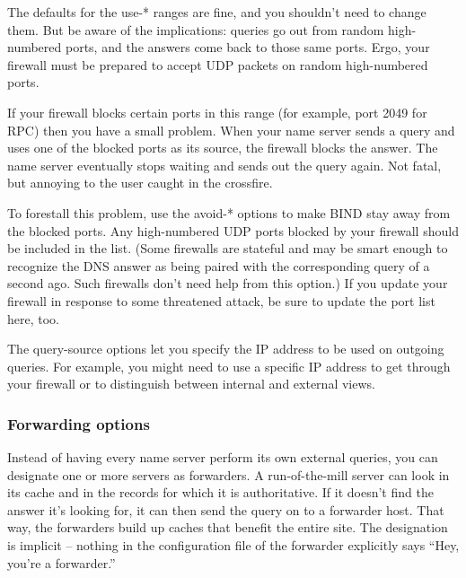 The defaults for the {use-*} ranges are fine, and you shouldn't need to
change them. But be aware of the implications: queries go out from
random high-numbered ports, and the answers come back to those same
ports. Ergo, your firewall must be prepared to accept UDP packets on
random high-numbered ports.

If your firewall blocks certain ports in this range (for example, port
2049 for RPC) then you have a small problem. When your name server sends
a query and uses one of the blocked ports as its source, the firewall
blocks the answer. The name server eventually stops waiting and sends
out the query again. Not fatal, but annoying to the user caught in the
crossfire.

To forestall this problem, use the {avoid-*} options to make BIND stay
away from the blocked ports. Any high-numbered UDP ports blocked by your
firewall should be included in the list. (Some firewalls are stateful
and may be smart enough to recognize the DNS answer as being paired with
the corresponding query of a second ago. Such firewalls don't need help
from this option.) If you update your firewall in response to some
threatened attack, be sure to update the port list here, too.

The {query-source} options let you specify the IP address to be used on
outgoing queries. For example, you might need to use a specific IP
address to get through your firewall or to distinguish between internal
and external views.

\subsubsection[Forwarding options]{\texorpdfstring{Forwarding
options\protect\hypertarget{part0024_split_037.htmlux5cux23_idIndexMarker2145}{}{}\protect\hypertarget{part0024_split_037.htmlux5cux23_idTextAnchor900}{}{}\protect\hypertarget{part0024_split_037.htmlux5cux23_idIndexMarker2146}{}{}}{Forwarding options}}


Instead of having every name server perform its own external queries,
you can designate one or more servers as forwarders. A run-of-the-mill
server can look in its cache and in the records for which it is
authoritative. If it doesn't find the answer it's looking for, it can
then send the query on to a forwarder host. That way, the forwarders
build up caches that benefit the entire site. The designation is
implicit -- nothing in the configuration file of the forwarder explicitly
says ``Hey, you're a forwarder.''

